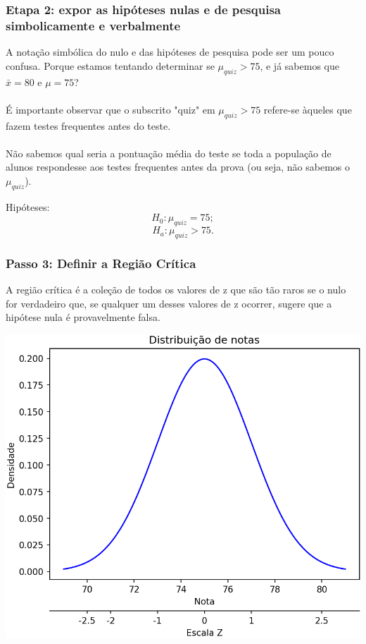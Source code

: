 \documentclass[11pt]{beamer}
\begin{document}
\begin{frame}
\frametitle{Etapa 2: expor as hipóteses nulas e de pesquisa simbolicamente e verbalmente}
A notação simbólica do nulo e das hipóteses de pesquisa pode ser um pouco confusa. Porque estamos tentando determinar se $\mu_{quiz} > 75$, e já sabemos que $\bar{x} = 80$ e $\mu = 75$? \\~\\
É importante observar que o subscrito "quiz" em $\mu_{quiz} > 75$ refere-se àqueles que fazem testes frequentes antes do teste.\\~\\

Não sabemos qual seria a pontuação média do teste se toda a população de alunos respondesse aos testes frequentes antes da prova (ou seja, não sabemos o $\mu_{quiz}$).

Hipóteses: 
\[H_0: \mu_{quiz}=75;\] 
\[H_a: \mu_{quiz}>75.\]

\end{frame}

\begin{frame}
\frametitle{Passo 3: Definir a Região Crítica}
A região crítica é a coleção de todos os valores de z que são tão raros se o nulo for verdadeiro que, se qualquer um desses valores de z ocorrer, sugere que a hipótese nula é provavelmente falsa.
\begin{center}\includegraphics[width=0.6\linewidth]{figs/two_xticks_under} \end{center}

\end{frame}
\end{document}
